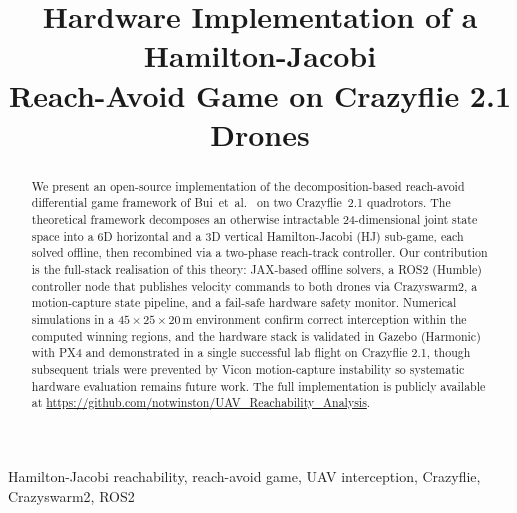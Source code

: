 \documentclass[conference]{IEEEtran}
\begin{document}
\pagestyle{plain}

\title{Hardware Implementation of a Hamilton-Jacobi\\
Reach-Avoid Game on Crazyflie 2.1 Drones}

\author{
  \and
  \and
}

\maketitle

\begin{abstract}
We present an open-source implementation of the decomposition-based reach-avoid differential game framework of Bui~et~al.~\cite{bui2025reach} on two Crazyflie~2.1 quadrotors. The theoretical framework decomposes an otherwise intractable 24-dimensional joint state space into a 6D horizontal and a 3D vertical Hamilton-Jacobi (HJ) sub-game, each solved offline, then recombined via a two-phase reach-track controller. Our contribution is the full-stack realisation of this theory: JAX-based offline solvers, a ROS2 (Humble) controller node that publishes velocity commands to both drones via Crazyswarm2, a motion-capture state pipeline, and a fail-safe hardware safety monitor. Numerical simulations in a $45{\times}25{\times}20\,$m environment confirm correct interception within the computed winning regions, and the hardware stack is validated in Gazebo (Harmonic) with PX4 and demonstrated in a single successful lab flight on Crazyflie 2.1, though subsequent trials were prevented by Vicon motion-capture instability so systematic hardware evaluation remains future work. The full implementation is publicly available at \url{https://github.com/notwinston/UAV_Reachability_Analysis}.
\end{abstract}

\begin{IEEEkeywords}
Hamilton-Jacobi reachability, reach-avoid game, UAV interception, Crazyflie, Crazyswarm2, ROS2
\end{IEEEkeywords}
\end{document}
